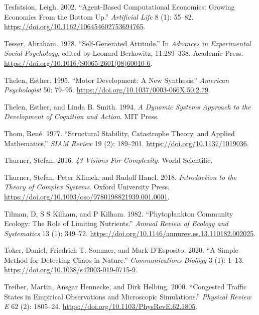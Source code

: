 \documentclass[
  a4paper,
  DIV=11,
  numbers=noendperiod,
  oneside]{scrreprt}
\newlength{\cslhangindent}
\newenvironment{CSLReferences}[2] %
 {\begin{list}{}{%
  \setlength{\itemindent}{0pt}
  \setlength{\leftmargin}{0pt}
  \setlength{\parsep}{0pt}
  \ifodd #1
   \setlength{\leftmargin}{\cslhangindent}
   \setlength{\itemindent}{-1\cslhangindent}
  \fi
  \setlength{\itemsep}{#2\baselineskip}}}
 {\end{list}}
\begin{document}
\begin{CSLReferences}{1}{0}
Tesfatsion, Leigh. 2002. {``Agent-{Based Computational Economics}:
{Growing Economies From} the {Bottom Up}.''} \emph{Artificial Life} 8
(1): 55--82. \url{https://doi.org/10.1162/106454602753694765}.

Tesser, Abraham. 1978. {``Self-{Generated Attitude}.''} In
\emph{Advances in {Experimental Social Psychology}}, edited by Leonard
Berkowitz, 11:289--338. {Academic Press}.
\url{https://doi.org/10.1016/S0065-2601(08)60010-6}.

Thelen, Esther. 1995. {``Motor Development: {A} New Synthesis.''}
\emph{American Psychologist} 50: 79--95.
\url{https://doi.org/10.1037/0003-066X.50.2.79}.

Thelen, Esther, and Linda B. Smith. 1994. \emph{A {Dynamic Systems
Approach} to the {Development} of {Cognition} and {Action}}. {MIT
Press}.

Thom, René. 1977. {``Structural {Stability}, {Catastrophe Theory}, and
{Applied Mathematics}.''} \emph{SIAM Review} 19 (2): 189--201.
\url{https://doi.org/10.1137/1019036}.

Thurner, Stefan. 2016. \emph{43 Visions For Complexity}. World
Scientific.

Thurner, Stefan, Peter Klimek, and Rudolf Hanel. 2018.
\emph{Introduction to the {Theory} of {Complex Systems}}. Oxford
University Press.
\url{https://doi.org/10.1093/oso/9780198821939.001.0001}.

Tilman, D, S S Kilham, and P Kilham. 1982. {``Phytoplankton {Community
Ecology}: {The Role} of {Limiting Nutrients}.''} \emph{Annual Review of
Ecology and Systematics} 13 (1): 349--72.
\url{https://doi.org/10.1146/annurev.es.13.110182.002025}.

Toker, Daniel, Friedrich T. Sommer, and Mark D'Esposito. 2020. {``A
Simple Method for Detecting Chaos in Nature.''} \emph{Communications
Biology} 3 (1): 1--13. \url{https://doi.org/10.1038/s42003-019-0715-9}.

Treiber, Martin, Ansgar Hennecke, and Dirk Helbing. 2000. {``Congested
Traffic States in Empirical Observations and Microscopic Simulations.''}
\emph{Physical Review E} 62 (2): 1805--24.
\url{https://doi.org/10.1103/PhysRevE.62.1805}.


\end{CSLReferences}
\end{document}
